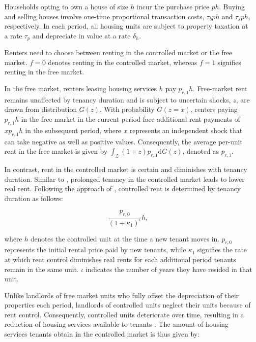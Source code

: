 \documentclass[parskip=full]{article}
\begin{document}
Households opting to own a house of size $h$ incur the purchase price $p h$. Buying and selling houses involve one-time proportional transaction costs, $\tau_{b} p h$ and $\tau_{s} p h$, respectively. In each period, all housing units are subject to property taxation at a rate $\tau_{p}$ and depreciate in value at a rate $\delta_h$.

Renters need to choose between renting in the controlled market or the free market. $f=0$ denotes renting in the controlled market, whereas $f=1$ signifies renting in the free market.

In the free market, renters leasing housing services $h$ pay $p_{r,1} h$. Free-market rent remains unaffected by tenancy duration and is subject to uncertain shocks, $z$, are drawn from distribution $G(z)$. With probability $G(z=x)$, renters paying $p_{r,1}h$ in the free market in the current period face additional rent payments of $x p_{r,1}h$ in the subsequent period, where $x$ represents an independent shock that can take negative as well as positive values. Consequently, the average per-unit rent in the free market is given by $\int_\mathcal{Z}(1+z)p_{r,1}\mathrm{d}G(z)$, denoted as $\overline{p}_{r,1}$.

In contrast, rent in the controlled market is certain and diminishes with tenancy duration. Similar to \citet{fmn-2023}, prolonged tenancy in the controlled market leads to lower real rent. Following the approach of \citet{fmn-2023}, controlled rent is determined by tenancy duration as follows:

\begin{equation}\label{eq:rent_in_controlled_market}
\frac{p_{r,0}}{(1+\kappa_{1})^{\iota}} h,
\end{equation} 

\noindent where $h$ denotes the controlled unit at the time a new tenant moves in. $p_{r,0}$ represents the initial rental price paid by new tenants, while $\kappa_{1}$ signifies the rate at which rent control diminishes real rents for each additional period tenants remain in the same unit. $\iota$ indicates the number of years they have resided in that unit.

Unlike landlords of free market units who fully offset the depreciation of their properties each period, landlords of controlled units neglect their units because of rent control. Consequently, controlled units deteriorate over time, resulting in a reduction of housing services available to tenants \citep{gl-1990,la-2018}. The amount of housing services tenants obtain in the controlled market is thus given by:
\end{document}
